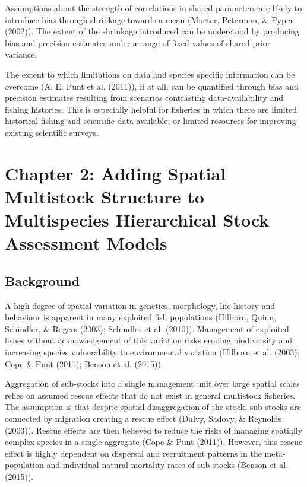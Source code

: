 \documentclass[12pt,]{scrartcl}
\begin{document}
Assumptions about the strength of correlations in shared parameters are
likely to introduce bias through shrinkage towards a mean (Mueter,
Peterman, \& Pyper (2002)). The extent of the shrinkage introduced can
be understood by producing bias and precision estimates under a range of
fixed values of shared prior variance.

The extent to which limitations on data and species specific information
can be overcome (A. E. Punt et al. (2011)), if at all, can be quantified
through bias and precision estimates resulting from scenarios
contrasting data-availability and fishing histories. This is especially
helpful for fisheries in which there are limited historical fishing and
scientific data available, or limited resources for improving existing
scientific surveys.

\section{Chapter 2: Adding Spatial Multistock Structure to Multispecies
Hierarchical Stock Assessment
Models}\label{chapter-2-adding-spatial-multistock-structure-to-multispecies-hierarchical-stock-assessment-models}

\subsection{Background}\label{background-2}

A high degree of spatial variation in genetics, morphology, life-history
and behaviour is apparent in many exploited fish populations (Hilborn,
Quinn, Schindler, \& Rogers (2003); Schindler et al. (2010)). Management
of exploited fishes without acknowledgement of this variation risks
eroding biodiversity and increasing species vulnerability to
environmental variation (Hilborn et al. (2003); Cope \& Punt (2011);
Benson et al. (2015)).

Aggregation of sub-stocks into a single management unit over large
spatial scales relies on assumed rescue effects that do not exist in
general multistock fisheries. The assumption is that despite spatial
disaggregation of the stock, sub-stocks are connected by migration
creating a rescue effect (Dulvy, Sadovy, \& Reynolds (2003)). Rescue
effects are then believed to reduce the risks of managing spatially
complex species in a single aggregate (Cope \& Punt (2011)). However,
this rescue effect is highly dependent on dispersal and recruitment
patterns in the meta-population and individual natural mortality rates
of sub-stocks (Benson et al. (2015)).
\end{document}
